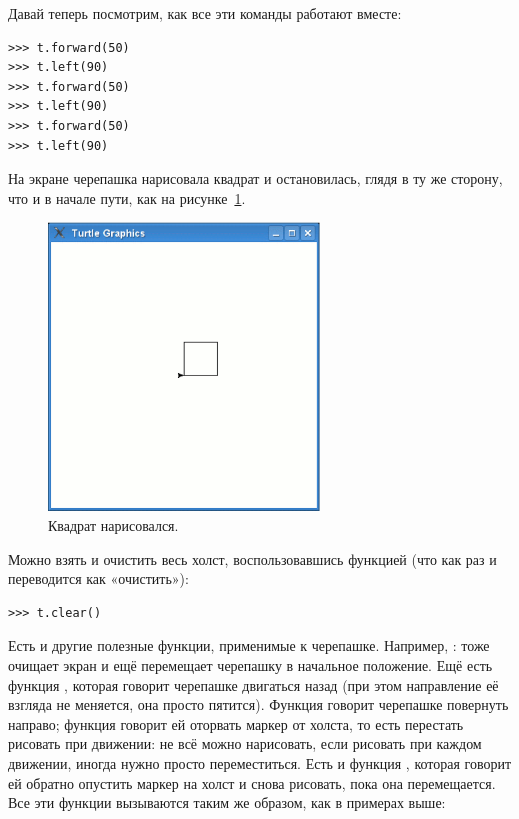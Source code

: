 Давай теперь посмотрим, как все эти команды работают вместе:

\begin{listing}
\begin{verbatim}
>>> t.forward(50)
>>> t.left(90)
>>> t.forward(50)
>>> t.left(90)
>>> t.forward(50)
>>> t.left(90)
\end{verbatim}
\end{listing}

На экране черепашка нарисовала квадрат и остановилась, глядя в ту же сторону, что и в начале пути, как на рисунке \ref{fig16}.

\begin{figure}
\begin{center}
\includegraphics[width=72mm]{../en/figure16.eps}
\end{center}
\caption{Квадрат нарисовался.}\label{fig16}
\end{figure}

Можно взять и очистить весь холст, воспользовавшись функцией  (что как раз и переводится как «очистить»):

\begin{listing}
\begin{verbatim}
>>> t.clear()
\end{verbatim}
\end{listing}

Есть и другие полезные функции, применимые к черепашке. Например, : тоже очищает экран и ещё перемещает черепашку в начальное положение. Ещё есть функция , которая говорит черепашке двигаться назад (при этом направление её взгляда не меняется, она просто пятится). Функция  говорит черепашке повернуть направо; функция  говорит ей оторвать маркер от холста, то есть перестать рисовать при движении: не всё можно нарисовать, если рисовать при каждом движении, иногда нужно просто переместиться. Есть и функция , которая говорит ей обратно опустить маркер на холст и снова рисовать, пока она перемещается. Все эти функции вызываются таким же образом, как в примерах выше:

